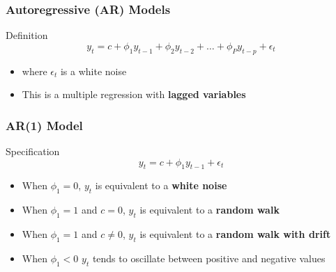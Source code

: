 \documentclass{beamer}
\begin{document}
\begin{frame}
  \frametitle{Autoregressive (AR) Models}

  \begin{block}{Definition}
    \begin{equation*}
      y_t = c + \phi_1 y_{t-1} + \phi_2 y_{t-2} + \dots + \phi_P y_{t-p} + \epsilon_t
    \end{equation*}

    \begin{itemize}
    \item where $\epsilon_t$ is a white noise
    \item This is a multiple regression with \textbf{lagged variables}
    \end{itemize}    
  \end{block}

\end{frame}


\begin{frame}
  \frametitle{AR(1) Model}
  \begin{block}{Specification}
    \begin{equation*}
      y_t = c + \phi_1 y_{t-1} + \epsilon_t
    \end{equation*}
  \end{block}

  \begin{itemize}
  \item When $\phi_1=0$, $y_t$ is equivalent to a \textbf{white noise}
  \item When $\phi_1=1$ and $c=0$, $y_t$ is equivalent to a \textbf{random walk}
  \item When $\phi_1=1$ and $c \neq 0$, $y_t$ is equivalent to a \textbf{random walk with drift}
  \item When $\phi_1<0$ $y_t$ tends to oscillate between positive and negative values 
  \end{itemize}
  
\end{frame}
\end{document}
